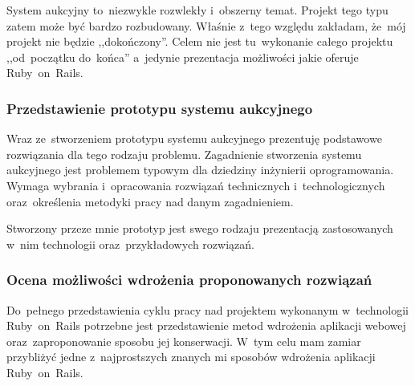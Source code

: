 System aukcyjny to~niezwykle rozwlekły i~obszerny temat. Projekt tego typu zatem może być bardzo rozbudowany. Właśnie z~tego względu zakładam, że~mój projekt nie będzie ,,dokończony''. Celem nie jest tu~wykonanie całego projektu ,,od~początku do~końca'' a~jedynie prezentacja możliwości jakie oferuje Ruby~on~Rails.

\subsubsection{Przedstawienie prototypu systemu aukcyjnego}

Wraz ze~stworzeniem prototypu systemu aukcyjnego prezentuję podstawowe rozwią\-zania dla tego rodzaju problemu. Zagadnienie stworzenia systemu aukcyjnego jest problemem typowym dla dziedziny inżynierii oprogramowania. Wymaga wybrania i~opracowania rozwiązań technicznych i~technologicznych oraz~określenia metodyki pracy nad danym zagadnieniem.


Stworzony przeze mnie prototyp jest swego rodzaju prezentacją zastosowanych w~nim technologii oraz~przykładowych rozwiązań.

\subsubsection{Ocena możliwości wdrożenia proponowanych rozwiązań}

Do~pełnego przedstawienia cyklu pracy nad projektem wykonanym w~technologii Ruby~on~Rails potrzebne jest przedstawienie metod wdrożenia aplikacji webowej oraz~zaproponowanie sposobu jej konserwacji. W~tym celu mam zamiar przybliżyć jedne z~najprostszych znanych mi sposobów wdrożenia aplikacji Ruby~on~Rails.
